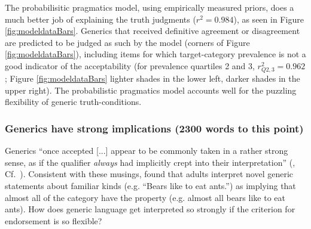 \documentclass[10pt,letterpaper]{article}
\newcommand{\red}[1]{\textcolor{Red}{#1}}
\newcommand{\mht}[1]{\textcolor{Blue}{[mht: #1]}}
\begin{document}
The probabilisitic pragmatics model, using empirically measured priors, does a much better job of explaining the truth judgments ($r^2=0.984$), as seen in Figure \ref{fig:modeldataBars}. 
Generics that received definitive agreement or disagreement are predicted to be judged as such by the model (corners of Figure \ref{fig:modeldataBars}), including items for which target-category prevalence is not a good indicator of the acceptability (for prevalence quartiles 2 and 3, $r_{Q2,3}^2=0.962$; Figure \ref{fig:modeldataBars} lighter shades in the lower left, darker shades in the upper right). 
The probabilistic pragmatics model accounts well for the puzzling flexibility of generic truth-conditions.

\subsubsection*{Generics have strong implications (2300 words to this point)} 

Generics ``once accepted [...] appear to be commonly taken in a rather strong sense, as if the qualifier \emph{always} had implicitly crept into their interpretation'' (, Cf.~). %
%
Consistent with these musings,
 found that adults interpret novel generic statements about familiar kinds (e.g. ``Bears like to eat ants.'') as implying that almost all of the category have the property (e.g. almost all bears like to eat ants).
How does generic language get interpreted so strongly if the criterion for endorsement is so flexible? 
\end{document}

